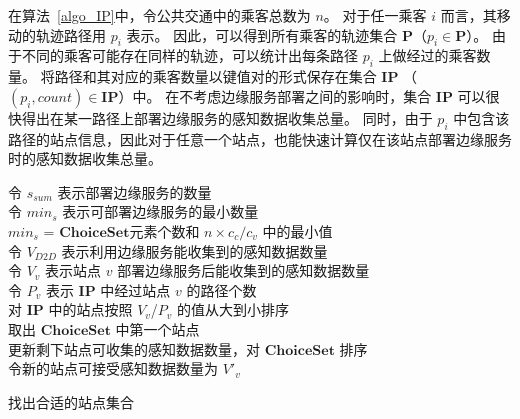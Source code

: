 在算法~\ref{algo_IP}中，令公共交通中的乘客总数为 $n$。
对于任一乘客 $i$ 而言，其移动的轨迹路径用 $p_i$ 表示。
因此，可以得到所有乘客的轨迹集合 $\boldsymbol{P}$（$p_i \in \boldsymbol{P}$）。
由于不同的乘客可能存在同样的轨迹，可以统计出每条路径 $p_i$ 上做经过的乘客数量。
将路径和其对应的乘客数量以键值对的形式保存在集合 $\boldsymbol{IP}$ （$(p_i, count) \in \boldsymbol{IP}$）中。
在不考虑边缘服务部署之间的影响时，集合 $\boldsymbol{IP}$ 可以很快得出在某一路径上部署边缘服务的感知数据收集总量。
同时，由于 $p_i$ 中包含该路径的站点信息，因此对于任意一个站点，也能快速计算仅在该站点部署边缘服务时的感知数据收集总量。

\begin{algorithm}[!b]
\setstretch{\algostretch}
令 $s_{sum}$ 表示部署边缘服务的数量\\
令 $min_s$ 表示可部署边缘服务的最小数量\\
$min_s$ = $\boldsymbol{ChoiceSet}$元素个数和 $n \times c_c/c_v$ 中的最小值\\
令 $V_{D2D}$ 表示利用边缘服务能收集到的感知数据数量\\
令 $V_v$ 表示站点 $v$ 部署边缘服务后能收集到的感知数据数量\\
令 $P_v$ 表示 $\boldsymbol{IP}$ 中经过站点 $v$ 的路径个数\\
对 $\boldsymbol{IP}$ 中的站点按照 $V_v$/$P_v$ 的值从大到小排序\\
取出 $\boldsymbol{ChoiceSet}$ 中第一个站点\\
更新剩下站点可收集的感知数据数量，对 $\boldsymbol{ChoiceSet}$ 排序\\
令新的站点可接受感知数据数量为 $V'_v$\\
\caption{找出合适的站点集合}
\label{algo_choice}
\end{algorithm}

